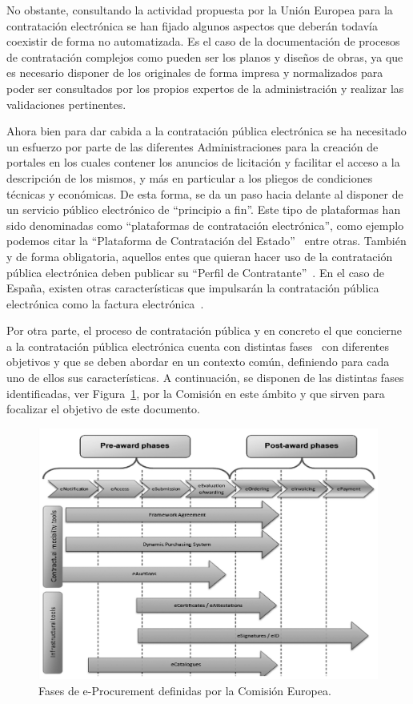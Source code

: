 No obstante, consultando la actividad propuesta por la Unión Europea para la contratación electrónica
se han fijado algunos aspectos que deberán todavía coexistir de forma no automatizada. Es el caso
de la documentación de procesos de contratación complejos como pueden ser los planos y diseños
de obras, ya que es necesario disponer de los originales de forma impresa y normalizados para poder ser consultados por
los propios expertos de la administración y realizar las validaciones pertinentes. 

Ahora bien para dar cabida a la contratación pública electrónica se ha necesitado un esfuerzo por parte
de las diferentes Administraciones para la creación de portales en los cuales contener los anuncios de licitación y facilitar
el acceso a la descripción de los mismos, y más en particular a los pliegos de condiciones técnicas y económicas. 
De esta forma, se da un paso hacia delante al disponer de un servicio público electrónico de ``principio a fin''. 
Este tipo de plataformas han sido denominadas como ``plataformas de contratación electrónica'', como ejemplo
podemos citar la ``Plataforma de Contratación del Estado''~\cite{PlataformaContratacionEstado} entre otras. 
También y de forma obligatoria, aquellos entes que quieran hacer uso de la contratación pública electrónica deben 
publicar su ``Perfil de Contratante''~\cite{PerfilContratante}. En el caso de España, existen otras características que impulsarán la 
contratación pública electrónica como la factura electrónica~\cite{FacturaElectronica}.

Por otra parte, el proceso de contratación pública y en concreto el que concierne a la contratación pública electrónica cuenta 
con distintas fases~\cite{siemensEval} con diferentes objetivos y que se deben abordar en un contexto común, definiendo 
para cada uno de ellos sus características.  A continuación, se disponen de las distintas fases identificadas, ver Figura~\ref{fig:ted-1}, 
por la Comisión en este ámbito y que sirven para focalizar el objetivo de este documento.


\begin{figure}[!htb]
\centering
	\includegraphics[width=16cm]{images/phd/eproc/ted-1}
\caption{Fases de e-Procurement definidas por la Comisión Europea.}
\label{fig:ted-1}
\end{figure}


